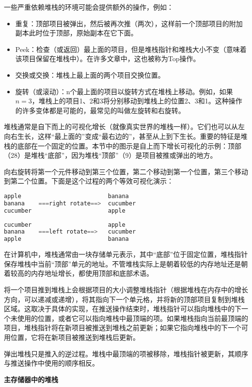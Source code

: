 一些严重依赖堆栈的环境可能会提供额外的操作，例如：
\begin{itemize}
\item 重复：顶部项目被弹出，然后被再次推（两次），这样前一个顶部项目的附加副本此时位于顶部，原始副本在它下面。
\item Peek：检查（或返回）最上面的项目，但是堆栈指针和堆栈大小不变（意味着该项目保留在堆栈中）。在许多文章中，这也被称为Top操作。
\item 交换或交换：堆栈上最上面的两个项目交换位置。
\item 旋转（或滚动）：n个最上面的项目以旋转方式在堆栈上移动。例如，如果$n=3$，堆栈上的项目1、2和3将分别移动到堆栈上的位置2、3和1。这种操作的许多变体都是可能的，最常见的叫做左旋转和右旋转。
\end{itemize}
堆栈通常是自下而上的可视化增长（就像真实世界的堆栈一样）。它们也可以从左向右生长，这样“最上面的”变成“最右边的”，甚至从上到下生长。重要的特征是堆栈的底部在一个固定的位置。本节中的图示是自上而下增长可视化的示例：顶部（28）是堆栈“底部”，因为堆栈“顶部”（9）是项目被推或弹出的地方。

向右旋转将第一个元件移动到第三个位置，第二个移动到第一个位置，第三个移动到第二个位置。下面是这个过程的两个等效可视化演示：
\begin{lstlisting}[language=cpp]
apple                         banana
banana    ===right rotate==>  cucumber
cucumber                      apple
\end{lstlisting}
\begin{lstlisting}[language=cpp]
cucumber                      apple
banana    ===left rotate==>   cucumber
apple                         banana
\end{lstlisting}
在计算机中，堆栈通常由一块存储单元表示，其中“底部”位于固定位置，堆栈指针保存堆栈中当前“顶部”单元的地址。不管堆栈实际上是朝着较低的内存地址还是朝着较高的内存地址增长，都使用顶部和底部术语。

将一个项目推到堆栈上会根据项目的大小调整堆栈指针（根据堆栈在内存中的增长方向，可以递减或递增），将其指向下一个单元格，并将新的顶部项目复制到堆栈区域。这取决于具体的实现，在推送操作结束时，堆栈指针可以指向堆栈中的下一个未使用的位置，或者它可以指向堆栈中最顶端的项。如果堆栈指向当前最顶端的项目，堆栈指针将在新项目被推送到堆栈之前更新；如果它指向堆栈中的下一个可用位置，它将在新项目被推送到堆栈后更新。

弹出堆栈只是推入的逆过程。堆栈中最顶端的项被移除，堆栈指针被更新，其顺序与推送操作中使用的顺序相反。

\textbf{主存储器中的堆栈}

